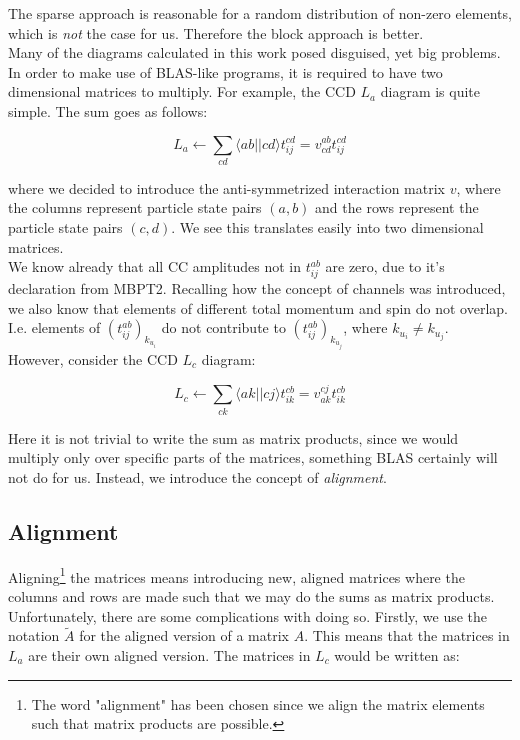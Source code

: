 \documentclass[10pt]{report}
\begin{document}
	The sparse approach is reasonable for a random distribution of non-zero elements, which is \emph{not} the case for us. Therefore the block approach is better.\\
	
	Many of the diagrams calculated in this work posed disguised, yet big problems. In order to make use of BLAS-like programs, it is required to have two dimensional matrices to multiply. For example, the CCD $L_a$ diagram is quite simple. The sum goes as follows:
	
	\begin{equation}
		L_a \leftarrow \sum_{cd}\langle ab||cd\rangle t_{ij}^{cd} = v_{cd}^{ab}t_{ij}^{cd}
	\end{equation}
	
	where we decided to introduce the anti-symmetrized interaction matrix $v$, where the columns represent particle state pairs $(a,b)$ and the rows represent the particle state pairs $(c,d)$. We see this translates easily into two dimensional matrices. \\
	We know already that all CC amplitudes not in $t_{ij}^{ab}$ are zero, due to it's declaration from MBPT2. Recalling how the concept of channels was introduced, we also know that elements of different total momentum and spin do not overlap. I.e. elements of $\left(t_{ij}^{ab}\right)_{k_{u_i}}$ do not contribute to $\left(t_{ij}^{ab}\right)_{k_{u_j}}$, where $k_{u_i}\neq k_{u_j}$.\\
	
	However, consider the CCD $L_c$ diagram:
	
	\begin{equation}
	L_c \leftarrow \sum_{ck}\langle ak||cj\rangle t_{ik}^{cb} = v_{ak}^{cj}t_{ik}^{cb}
	\end{equation}
	
	Here it is not trivial to write the sum as matrix products, since we would multiply only over specific parts of the matrices, something BLAS certainly will not do for us. Instead, we introduce the concept of \emph{alignment}.\\
	
	\subsection{Alignment}
	Aligning\footnote{The word "alignment" has been chosen since we align the matrix elements such that matrix products are possible.} the matrices means introducing new, aligned matrices where the columns and rows are made such that we may do the sums as matrix products. Unfortunately, there are some complications with doing so. Firstly, we use the notation $\tilde{A}$ for the aligned version of a matrix $A$. This means that the matrices in $L_a$ are their own aligned version. The matrices in $L_c$ would be written as:
	
\end{document}

